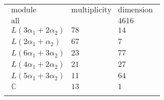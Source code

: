 \documentclass[crop,border=2mm]{standalone}
\begin{document}
\begin{tabular}{l}
$\displaystyle
\begin{array}{rll}
	\text{module}&\text{multiplicity}&\text{dimension} \\ \hline \text{all}&&4616 \\
	L\left( 3\alpha_{1}+ 2\alpha_{2}\right)&78&14\\
	L\left( 2\alpha_{1}+\alpha_{2}\right)&67&7\\
	L\left( 6\alpha_{1}+ 3\alpha_{2}\right)&23&77\\
	L\left( 4\alpha_{1}+ 2\alpha_{2}\right)&21&27\\
	L\left( 5\alpha_{1}+ 3\alpha_{2}\right)&11&64\\
	\mathbb{C}&13&1
\end{array}
$ \\ \\

\end{tabular}
\end{document}
